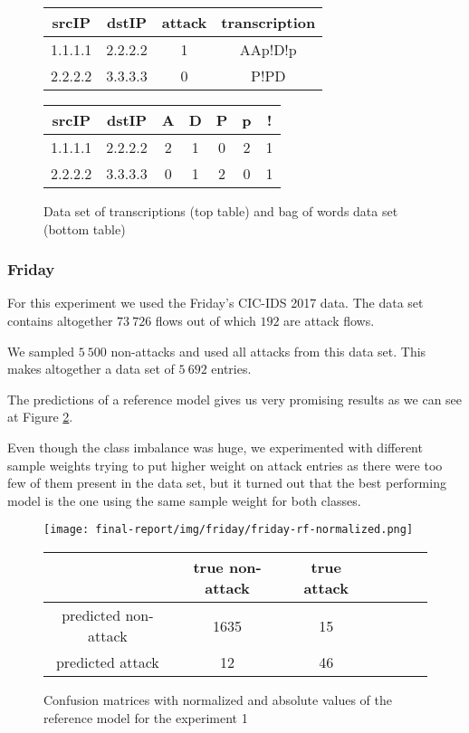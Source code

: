 \documentclass{article}
\begin{document}
\begin{figure}[h!]
\centering
\begin{tabular}{ |c|c|c|c| }
 \hline
 srcIP & dstIP & attack & transcription \\
 \hline
 1.1.1.1 & 2.2.2.2 & 1 & AAp!D!p \\
 2.2.2.2 & 3.3.3.3 & 0 & P!PD \\
 \hline
\end{tabular}

\vspace{0.3cm}

\begin{tabular}{ |c|c|c|c|c|c|c| }
 \hline
 srcIP & dstIP & A & D & P & p & ! \\
 \hline
 1.1.1.1 & 2.2.2.2 & 2 & 1 & 0 & 2 & 1 \\
 2.2.2.2 & 3.3.3.3 & 0 & 1 & 2 & 0 & 1 \\
 \hline
\end{tabular}
\caption{Data set of transcriptions (top table) and bag of words data set (bottom table)}
\label{fig-bag-of-words-example}
\end{figure}


\clearpage

\subsubsection{Friday}

For this experiment we used the Friday's CIC-IDS 2017 data. The data set contains altogether $73\ 726$ flows out of which $192$ are attack flows.

We sampled $5\ 500$ non-attacks and used all attacks from this data set. This makes altogether a data set of $5\ 692$ entries.

The predictions of a reference model gives us very promising results as we can see at Figure \ref{fig-exp1-reference-model}.

Even though the class imbalance was huge, we experimented with different sample weights trying to put higher weight on attack entries as there were too few of them present in the data set, but it turned out that the best performing model is the one using the same sample weight for both classes.

\begin{figure}[h!]
    \centering
    \texttt{[image: final-report/img/friday/friday-rf-normalized.png]}

    \centering
    \begin{tabular}{ |c|c|c|c|c|c|c| }
     \hline
      & true non-attack & true attack \\
     \hline
     predicted non-attack & 1635 & 15 \\
     \hline
     predicted attack & 12 & 46 \\
     \hline
    \end{tabular}

    \caption{Confusion matrices with normalized and absolute values of the reference model for the experiment 1}
    \label{fig-exp1-reference-model}
\end{figure}
\end{document}
